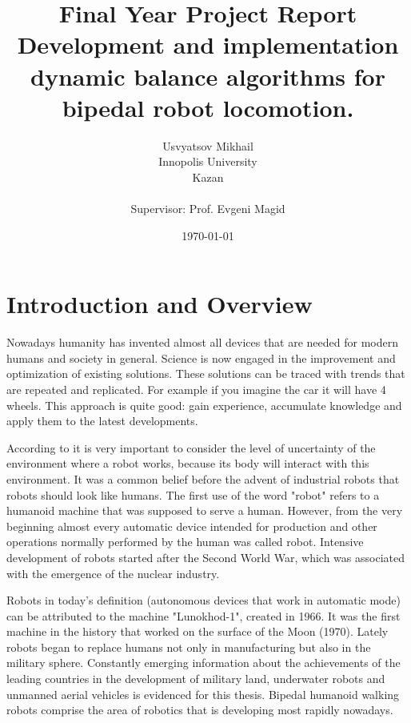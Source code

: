 \documentclass[12pt,a4paper]{report}
\begin{document}
	
	\title{Final Year Project Report\\ Development and implementation dynamic balance algorithms for bipedal robot locomotion.}
	\author{Usvyatsov Mikhail\\Innopolis University\\Kazan\\  ~\\ \normalsize Supervisor: Prof. Evgeni Magid}
	\date{\normalsize \today}
	\maketitle
	
	\tableofcontents
	
	\newpage

	\chapter{Introduction and Overview}
		Nowadays humanity has invented almost all devices that are needed for modern humans and society in general. Science is now engaged in the improvement and optimization of existing solutions. These solutions can be traced with trends that are repeated and replicated. For example if you imagine the car it will have 4 wheels. This approach is quite good: gain experience, accumulate knowledge and apply them to the latest developments.
		
		According to \cite{pfeifer2007self} it is very important to consider the level of uncertainty of the environment where a robot works, because its body will interact with this environment. It was a common belief before the advent of industrial robots that robots should look like humans. The first use of the word "robot" refers to a humanoid machine that was supposed to serve a human. However, from the very beginning almost every automatic device intended for production and other operations normally performed by the human was called robot. Intensive development of robots started after the Second World War, which was associated with the emergence of the nuclear industry.
		
		Robots in today's definition (autonomous devices that work in automatic mode) can be attributed to the machine "Lunokhod-1", created in 1966. It was the first machine in the history that worked on the surface of the Moon (1970). Lately robots began to replace humans not only in manufacturing but also in the military sphere. Constantly emerging information about the achievements of the leading countries in the development of military land, underwater robots and unmanned aerial vehicles is evidenced for this thesis. Bipedal humanoid walking robots comprise the area of robotics that is developing most rapidly nowadays.
		
\end{document}
